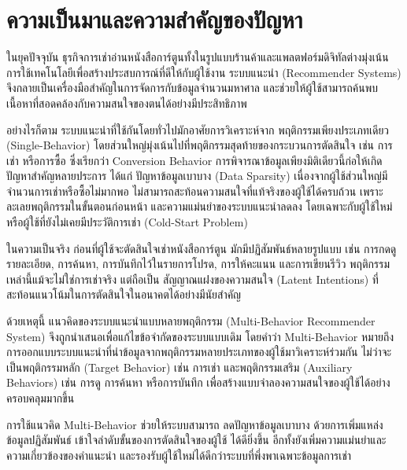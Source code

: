 
\section{ความเป็นมาและความสำคัญของปัญหา}

ในยุคปัจจุบัน ธุรกิจการเช่าอ่านหนังสือการ์ตูนทั้งในรูปแบบร้านค้าและแพลตฟอร์มดิจิทัลต่างมุ่งเน้นการใช้เทคโนโลยีเพื่อสร้างประสบการณ์ที่ดีให้กับผู้ใช้งาน ระบบแนะนำ (Recommender Systems) จึงกลายเป็นเครื่องมือสำคัญในการจัดการกับข้อมูลจำนวนมหาศาล และช่วยให้ผู้ใช้สามารถค้นพบเนื้อหาที่สอดคล้องกับความสนใจของตนได้อย่างมีประสิทธิภาพ \cite{ricci2015}

อย่างไรก็ตาม ระบบแนะนำที่ใช้กันโดยทั่วไปมักอาศัยการวิเคราะห์จาก พฤติกรรมเพียงประเภทเดียว (Single-Behavior) โดยส่วนใหญ่มุ่งเน้นไปที่พฤติกรรมสุดท้ายของกระบวนการตัดสินใจ เช่น การเช่า หรือการซื้อ ซึ่งเรียกว่า Conversion Behavior การพิจารณาข้อมูลเพียงมิติเดียวนี้ก่อให้เกิดปัญหาสำคัญหลายประการ ได้แก่ ปัญหาข้อมูลเบาบาง (Data Sparsity) เนื่องจากผู้ใช้ส่วนใหญ่มีจำนวนการเช่าหรือซื้อไม่มากพอ ไม่สามารถสะท้อนความสนใจที่แท้จริงของผู้ใช้ได้ครบถ้วน เพราะละเลยพฤติกรรมในขั้นตอนก่อนหน้า และความแม่นยำของระบบแนะนำลดลง โดยเฉพาะกับผู้ใช้ใหม่หรือผู้ใช้ที่ยังไม่เคยมีประวัติการเช่า (Cold-Start Problem) \cite{ricci2015}

ในความเป็นจริง ก่อนที่ผู้ใช้จะตัดสินใจเช่าหนังสือการ์ตูน มักมีปฏิสัมพันธ์หลายรูปแบบ เช่น การกดดูรายละเอียด, การค้นหา, การบันทึกไว้ในรายการโปรด, การให้คะแนน และการเขียนรีวิว พฤติกรรมเหล่านี้แม้จะไม่ใช่การเช่าจริง แต่ถือเป็น สัญญาณแฝงของความสนใจ (Latent Intentions) ที่สะท้อนแนวโน้มในการตัดสินใจในอนาคตได้อย่างมีนัยสำคัญ \cite{wang2019dmran}

ด้วยเหตุนี้ แนวคิดของระบบแนะนำแบบหลายพฤติกรรม (Multi-Behavior Recommender System) จึงถูกนำเสนอเพื่อแก้ไขข้อจำกัดของระบบแบบเดิม โดยคำว่า Multi-Behavior หมายถึง การออกแบบระบบแนะนำที่นำข้อมูลจากพฤติกรรมหลายประเภทของผู้ใช้มาวิเคราะห์ร่วมกัน ไม่ว่าจะเป็นพฤติกรรมหลัก (Target Behavior) เช่น การเช่า และพฤติกรรมเสริม (Auxiliary Behaviors) เช่น การดู การค้นหา หรือการบันทึก เพื่อสร้างแบบจำลองความสนใจของผู้ใช้ได้อย่างครอบคลุมมากขึ้น \cite{wang2019dmran}

การใช้แนวคิด Multi-Behavior ช่วยให้ระบบสามารถ ลดปัญหาข้อมูลเบาบาง ด้วยการเพิ่มแหล่งข้อมูลปฏิสัมพันธ์ เข้าใจลำดับขั้นของการตัดสินใจของผู้ใช้ ได้ดียิ่งขึ้น อีกทั้งยังเพิ่มความแม่นยำและความเกี่ยวข้องของคำแนะนำ และรองรับผู้ใช้ใหม่ได้ดีกว่าระบบที่พึ่งพาเฉพาะข้อมูลการเช่า \cite{mbgcn_nd}

